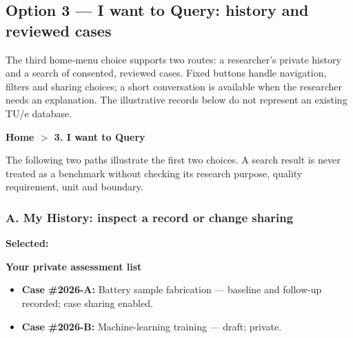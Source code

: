 \subsection{Option 3 --- I want to Query: history and reviewed cases}
\label{sec:query-dialogue}
The third home-menu choice supports two routes: a researcher's private history and a search of consented, reviewed cases. Fixed buttons handle navigation, filters and sharing choices; a short conversation is available when the researcher needs an explanation. The illustrative records below do not represent an existing TU/e database.


\begin{queryscreen}
\textbf{Home $>$ 3. I want to Query}\par\medskip
{}\quad
{}\quad
{}\quad
{}\par\medskip
The following two paths illustrate the first two choices. A search result is never treated as a benchmark without checking its research purpose, quality requirement, unit and boundary.
\end{queryscreen}

\subsubsection*{A. My History: inspect a record or change sharing}
\begin{queryscreen}
\textbf{Selected:} \par
\textbf{Your private assessment list}\par
\begin{itemize}[nosep,leftmargin=1.5em]
  \item \textbf{Case \#2026-A:} Battery sample fabrication --- baseline and follow-up recorded; case sharing enabled.
  \item \textbf{Case \#2026-B:} Machine-learning training --- draft; private.
\end{itemize}
\quad
{}\quad
{}\quad
{}
\end{queryscreen}

